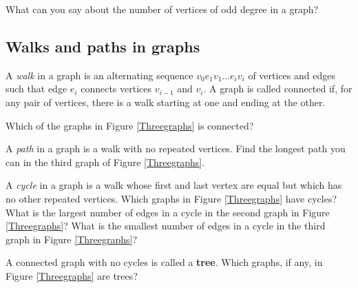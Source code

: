 \itemes What can you say about the number of vertices of odd degree in a
graph?
\ep



\subsection{Walks and paths in graphs}
A {\em walk} in a graph is an alternating sequence $v_0e_1v_1\ldots
e_iv_i$ of vertices and edges such that edge $e_i$ connects vertices
$v_{i-1}$ and $v_i$.  A graph is called connected if, for any pair of
vertices, there is a walk starting at one and ending at the other.
\bp\item
Which of the graphs in Figure \ref{Threegraphs} is
connected?\label{connectedanddisconnected} 

\itemm 
A {\em path} in a graph is a walk with no repeated vertices.  Find the
longest path you can in the third graph of Figure \ref{Threegraphs}.
 
\itemm A {\em cycle} in a graph is a walk whose first and last vertex are
equal but which has no other repeated vertices.  Which graphs in Figure
\ref{Threegraphs} have cycles?  What is the largest number of edges in a
cycle in the second graph in Figure \ref{Threegraphs}?  What is the
smallest number of edges in a cycle in the third graph in Figure
\ref{Threegraphs}?

\itemm A connected graph with no cycles is called a {\bf
tree}.  Which graphs, if any, in Figure \ref{Threegraphs} are
trees?
\ep

